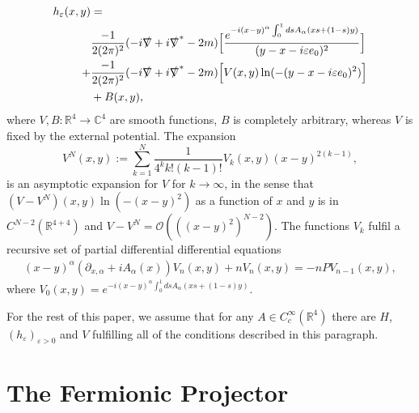 \documentclass[a4paper,11pt]{article}
\begin{document}
\begin{align}\nonumber
h_\varepsilon (x,y)&=\\\label{eq:hadamardexp1}
&\frac{-1}{2(2\pi)^2}(-i \slashed{\nabla} + i \slashed{\nabla}^\ast -2m)\Big[\frac{e^{-i (x-y)^\alpha\int_0^1 ds A_\alpha (x s + (1-s)y)}}{ (y-x-i \varepsilon e_0)^2}\Big]\\\label{eq:hadamardexp2}
+&\frac{-1}{2(2\pi)^2}(-i \slashed{\nabla} + i \slashed{\nabla}^\ast -2m)\Big[ V(x,y) \ln (-(y-x-i \varepsilon e_0)^2)\Big]\\\label{eq:hadamardexp3}
&+B(x,y),
\end{align}
%
%
where \(V,B:\mathbb{R}^4\rightarrow \mathbb{C}^4\) are smooth functions, \(B\) is completely arbitrary, 
whereas \(V\) is fixed by the external potential. The expansion
\begin{equation}
V^N(x,y):=\sum_{k=1}^N \frac{1}{ 4^{k} k!(k-1)!} V_k(x,y) (x-y)^{2(k-1)},
\end{equation}
is an asymptotic expansion for \(V\) for \(k\rightarrow \infty\), in the sense that
\((V-V^N)(x,y)\ln(-(x-y)^2)\) as a function of \(x\) and \(y\) is in \(C^{N-2}(\mathbb{R}^{4+4})\)
and \(V-V^N=\mathcal{O}\left(\left((x-y)^{2}\right)^{N-2}\right)\).
The functions \(V_k\) fulfil a recursive set of partial differential differential equations
\begin{align}\label{Hadamard recursive equ.}
(x-y)^\alpha (\partial_{x,\alpha}+i A_\alpha(x)) V_{n}(x,y) + n V_{n}(x,y)=-n P V_{n-1}(x,y),
\end{align}
where \(V_{0}(x,y)=e^{-i (x-y)^\alpha\int_0^1 ds A_\alpha (x s + (1-s)y)}\). 

For the rest of this paper, we assume that for any \(A\in C_c^\infty(\mathbb{R}^4)\) there are \(H\), \((h_\varepsilon)_{\varepsilon>0}\) and \(V\)
fulfilling all of the conditions described in this paragraph.







\section{The Fermionic Projector}\label{sec:ferm proj}
\end{document}
